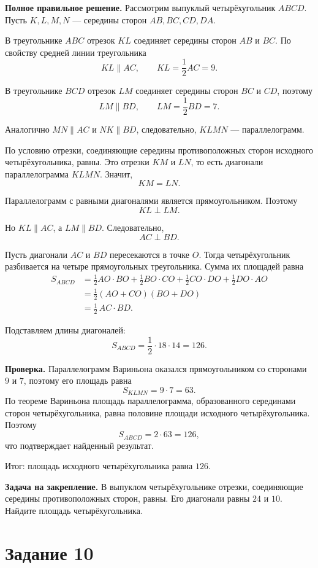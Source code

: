 \documentclass[12pt,a4paper]{article}
\begin{document}
\textbf{Полное правильное решение.}
Рассмотрим выпуклый четырёхугольник $ABCD$. Пусть $K,L,M,N$ --- середины сторон $AB,BC,CD,DA$.

В треугольнике $ABC$ отрезок $KL$ соединяет середины сторон $AB$ и $BC$. По свойству средней линии треугольника
\[
KL\parallel AC,\qquad KL=\frac12 AC=9.
\]

В треугольнике $BCD$ отрезок $LM$ соединяет середины сторон $BC$ и $CD$, поэтому
\[
LM\parallel BD,\qquad LM=\frac12 BD=7.
\]

Аналогично $MN\parallel AC$ и $NK\parallel BD$, следовательно, $KLMN$ --- параллелограмм.

По условию отрезки, соединяющие середины противоположных сторон исходного четырёхугольника, равны. Это отрезки $KM$ и $LN$, то есть диагонали параллелограмма $KLMN$. Значит,
\[
KM=LN.
\]

Параллелограмм с равными диагоналями является прямоугольником. Поэтому
\[
KL\perp LM.
\]

Но $KL\parallel AC$, а $LM\parallel BD$. Следовательно,
\[
AC\perp BD.
\]

Пусть диагонали $AC$ и $BD$ пересекаются в точке $O$. Тогда четырёхугольник разбивается на четыре прямоугольных треугольника. Сумма их площадей равна
\[
\begin{aligned}
S_{ABCD}
&=\frac12 AO\cdot BO+\frac12 BO\cdot CO
 +\frac12 CO\cdot DO+\frac12 DO\cdot AO\\
&=\frac12(AO+CO)(BO+DO)\\
&=\frac12\,AC\cdot BD.
\end{aligned}
\]

Подставляем длины диагоналей:
\[
S_{ABCD}=\frac12\cdot18\cdot14=126.
\]

\textbf{Проверка.}
Параллелограмм Вариньона оказался прямоугольником со сторонами $9$ и $7$, поэтому его площадь равна
\[
S_{KLMN}=9\cdot7=63.
\]
По теореме Вариньона площадь параллелограмма, образованного серединами сторон четырёхугольника, равна половине площади исходного четырёхугольника. Поэтому
\[
S_{ABCD}=2\cdot63=126,
\]
что подтверждает найденный результат.

\textcolor{teal!60!black}{Итог:} площадь исходного четырёхугольника равна $126$.

\textbf{Задача на закрепление.}
В выпуклом четырёхугольнике отрезки, соединяющие середины противоположных сторон, равны. Его диагонали равны $24$ и $10$. Найдите площадь четырёхугольника.

\newpage
{}\label{task:10}
\section*{Задание 10}
\end{document}
